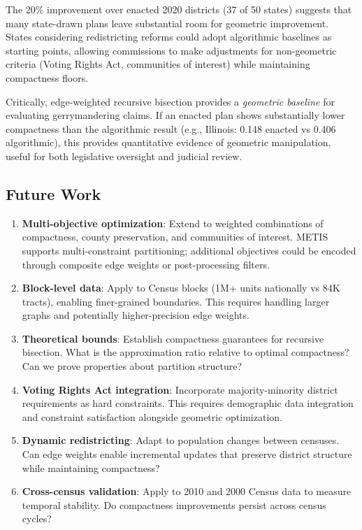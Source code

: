 The 20\% improvement over enacted 2020 districts (37 of 50 states) suggests that many state-drawn plans leave substantial room for geometric improvement. States considering redistricting reforms could adopt algorithmic baselines as starting points, allowing commissions to make adjustments for non-geometric criteria (Voting Rights Act, communities of interest) while maintaining compactness floors.

Critically, edge-weighted recursive bisection provides a \textit{geometric baseline} for evaluating gerrymandering claims. If an enacted plan shows substantially lower compactness than the algorithmic result (e.g., Illinois: 0.148 enacted vs 0.406 algorithmic), this provides quantitative evidence of geometric manipulation, useful for both legislative oversight and judicial review.

\subsection{Future Work}

\begin{enumerate}
    \item \textbf{Multi-objective optimization}: Extend to weighted combinations of compactness, county preservation, and communities of interest. METIS supports multi-constraint partitioning; additional objectives could be encoded through composite edge weights or post-processing filters.

    \item \textbf{Block-level data}: Apply to Census blocks (1M+ units nationally vs 84K tracts), enabling finer-grained boundaries. This requires handling larger graphs and potentially higher-precision edge weights.

    \item \textbf{Theoretical bounds}: Establish compactness guarantees for recursive bisection. What is the approximation ratio relative to optimal compactness? Can we prove properties about partition structure?

    \item \textbf{Voting Rights Act integration}: Incorporate majority-minority district requirements as hard constraints. This requires demographic data integration and constraint satisfaction alongside geometric optimization.

    \item \textbf{Dynamic redistricting}: Adapt to population changes between censuses. Can edge weights enable incremental updates that preserve district structure while maintaining compactness?

    \item \textbf{Cross-census validation}: Apply to 2010 and 2000 Census data to measure temporal stability. Do compactness improvements persist across census cycles?
\end{enumerate}
